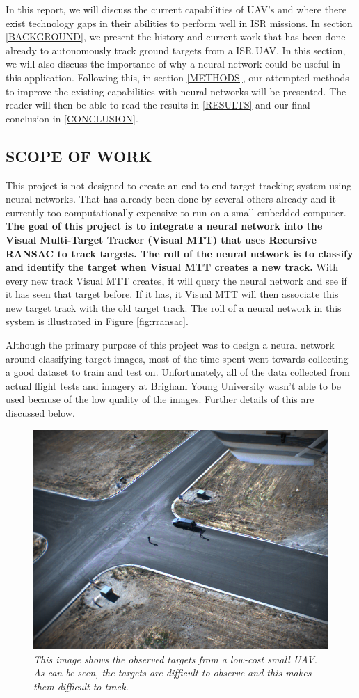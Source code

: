 \documentclass[letterpaper, 10 pt, conference]{ieeeconf}  %
\begin{document}
In this report, we will discuss the current capabilities of UAV's and where there exist technology gaps in their abilities to perform well in ISR missions. In section \ref{BACKGROUND}, we present the history and current work that has been done already to autonomously track ground targets from a ISR UAV. In this section, we will also discuss the importance of why a neural network could be useful in this application. Following this, in section \ref{METHODS}, our attempted methods to improve the existing capabilities with neural networks will be presented. The reader will then be able to read the results in \ref{RESULTS} and our final conclusion in \ref{CONCLUSION}.

\subsection{SCOPE OF WORK}

This project is not designed to create an end-to-end target tracking system using neural networks. That has already been done by several others already and it currently too computationally expensive to run on a small embedded computer. \textbf{The goal of this project is to integrate a neural network into the Visual Multi-Target Tracker (Visual MTT) that uses Recursive RANSAC to track targets. The roll of the neural network is to classify and identify the target when Visual MTT creates a new track.} With every new track Visual MTT creates, it will query the neural network and see if it has seen that target before. If it has, it Visual MTT will then associate this new target track with the old target track. The roll of a neural network in this system is illustrated in Figure \ref{fig:rransac}.

Although the primary purpose of this project was to design a neural network around classifying target images, most of the time spent went towards collecting a good dataset to train and test on. Unfortunately, all of the data collected from actual flight tests and imagery at Brigham Young University wasn't able to be used because of the low quality of the images. Further details of this are discussed below.

\begin{figure}
	\begin{center}
		\includegraphics[width=.45\textwidth]{gimbal_far.png}
		\caption{\textit{This image shows the observed targets from a low-cost small UAV. As can be seen, the targets are difficult to observe and this makes them difficult to track.}} 
		\label{fig:gimbal_far}
	\end{center}
\end{figure}
\end{document}
